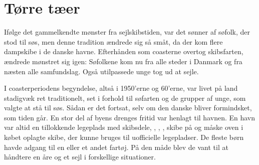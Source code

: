 \chapter{Tørre tæer}\label{tuxf8rre-tuxe6er}

Ifølge det gammelkendte mønster fra sejlskibstiden, var det sønner af
søfolk, der stod til søs, men denne tradition ændrede sig så småt, da der
kom flere dampskibe i de danske havne. Efterhånden som coasterne overtog
skibsfarten, ændrede mønstret sig igen: Søfolkene kom nu fra alle steder i
Danmark og fra næsten alle samfundslag. Også utilpassede unge tog ud at
sejle. 

I coasterperiodens begyndelse, altså i 1950'erne og 60'erne, var livet på
land stadigvæk ret traditionelt, set i forhold til søfarten og de grupper
af unge, som valgte at stå til søs. Sådan er det fortsat, selv om den
danske  bliver formindsket, som tiden går.
En stor del af byens drenges fritid var henlagt til havnen.  En havn var
altid en tillokkende legeplads med skibsdele, ,
, , skibe på  og
måske oven i købet oplagte skibe, der kunne bruges til uofficielle
legepladser. De fleste børn havde adgang til en  eller et andet fartøj. På den måde blev de vant til at
håndtere en åre og et sejl i forskellige situationer.

